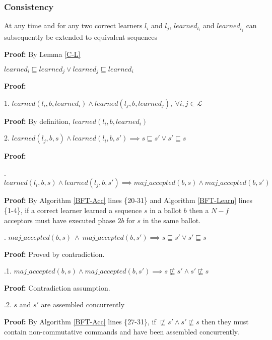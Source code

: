 \subsubsection{Consistency}
\begin{theorem}At any time and for any two correct learners $l_i$ and $l_j$, $learned_{l_i}$ and $learned_{l_j}$ can subsequently be extended to equivalent sequences
\end{theorem} 
\textbf{Proof:} By Lemma \ref{C-L}
\begin{lemma}
$learned_i \sqsubseteq learned_j \lor learned_j \sqsubseteq  learned_i$ \label{C-L} \par
\end{lemma}
\textbf{Proof:} \par
1. $learned(l_i,b,learned_i) \land learned(l_j,b,learned_j),\ \forall i,j \in \mathcal{L}$ \par
\indent\indent\textbf{Proof:} By definition, $learned(l_i,b,learned_i)$ \par
2. $learned(l_j,b,s) \land learned(l_i,b,s') \implies s \sqsubseteq s' \lor s' \sqsubseteq s$ \par
\indent\indent\textbf{Proof:} \par
\indent\indent{}. $learned(l_i,b,s) \land learned(l_j,b,s') \implies maj\_accepted(b,s) \land maj\_accepted(b,s')$ \par
\indent\indent\indent\indent\parbox{\linewidth}{\textbf{Proof:} By Algorithm \ref{BFT-Acc} lines \{20-31\} and Algorithm \ref{BFT-Learn} lines \{1-4\}, if a correct learner learned a sequence $s$ in a ballot $b$ then a $N-f$ acceptors must have executed phase $2b$ for $s$ in the same ballot.}\par
\indent\indent{}. $maj\_accepted(b,s)\ \land\ maj\_accepted(b,s') \implies s \sqsubseteq s' \lor s' \sqsubseteq s$ \par
\indent\indent\indent\indent\textbf{Proof:} Proved by contradiction.\par
\indent\indent\indent\indent{}.1. $maj\_accepted(b,s) \land maj\_accepted(b,s') \implies s \not\sqsubseteq s' \land s' \not\sqsubseteq s$ \par
\indent\indent\indent\indent\indent\indent\textbf{Proof:} Contradiction assumption.\par
\indent\indent\indent\indent{}.2. $s$ and $s'$ are assembled concurrently \par
\indent\indent\indent\indent\indent\indent \parbox{\linewidth}{\textbf{Proof:} By Algorithm \ref{BFT-Acc} lines \{27-31\}, if $\not\sqsubseteq s' \land s' \not\sqsubseteq s$ then they must contain non-commutative commands and have been assembled concurrently.}\par
